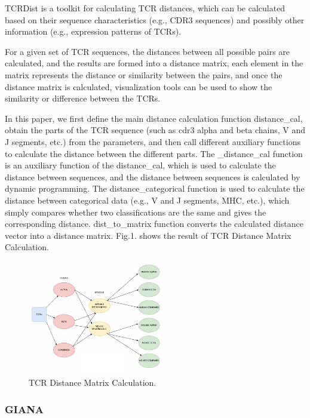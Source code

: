 \documentclass[conference]{IEEEtran}
\begin{document}
	TCRDist\cite{b2}\cite{b3} is a toolkit for calculating TCR distances, which can be calculated based on their sequence characteristics (e.g., CDR3 sequences) and possibly other information (e.g., expression patterns of TCRs).
	
	For a given set of TCR sequences, the distances between all possible pairs are calculated, and the results are formed into a distance matrix, each element in the matrix represents the distance or similarity between the pairs, and once the distance matrix is calculated, visualization tools can be used to show the similarity or difference between the TCRs.
	
	In this paper, we first define the main distance calculation function distance\_cal, obtain the parts of the TCR sequence (such as cdr3 alpha and beta chains, V and J segments, etc.) from the parameters, and then call different auxiliary functions to calculate the distance between the different parts. The \_distance\_cal function is an auxiliary function of the distance\_cal, which is used to calculate the distance between sequences, and the distance between sequences is calculated by dynamic programming. The distance\_categorical function is used to calculate the distance between categorical data (e.g., V and J segments, MHC, etc.), which simply compares whether two classifications are the same and gives the corresponding distance. dist\_to\_matrix function converts the calculated distance vector into a distance matrix. Fig.1. shows the result of TCR Distance Matrix Calculation.
	
	\begin{figure}[h]
		\centering
		\includegraphics[height=5cm]{fig1.png}
		\caption{TCR Distance Matrix Calculation.}
		\label{fig}
	\end{figure}
	
	\subsubsection{GIANA} \
	
\end{document}
